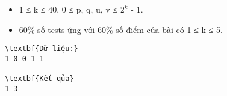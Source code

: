 \begin{itemize}
	\item 1 ≤ k ≤ 40, 0 ≤ p, q, u, v ≤ $2^{k}$ - 1.
	\item 60\% số tests ứng với 60\% số điểm của bài có 1 ≤ k ≤ 5.
\end{itemize}
\begin{verbatim}
\textbf{Dữ liệu:}
1 0 0 1 1

\textbf{Kết qủa}
1 3
\end{verbatim}